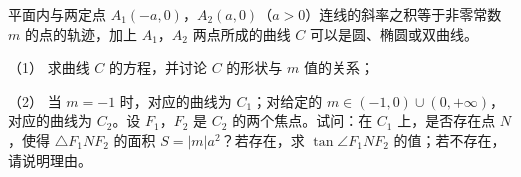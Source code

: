 \begin{question}
平面内与两定点 $A_1(-a,0)$，$A_2(a,0)$（$a>0$）连线的斜率之积等于非零常数 $m$ 的点的轨迹，加上 $A_1$，$A_2$ 两点所成的曲线 $C$ 可以是圆、椭圆或双曲线。

（1） 求曲线 $C$ 的方程，并讨论 $C$ 的形状与 $m$ 值的关系；

（2） 当 $m=-1$ 时，对应的曲线为 $C_1$；对给定的 $m\in(-1,0)\cup(0,+\infty)$，对应的曲线为 $C_2$。设 $F_1$，$F_2$ 是 $C_2$ 的两个焦点。试问：在 $C_1$ 上，是否存在点 $N$，使得 $\triangle F_1NF_2$ 的面积 $S=|m|a^2$？若存在，求 $\tan\angle F_1NF_2$ 的值；若不存在，请说明理由。

\end{question}
